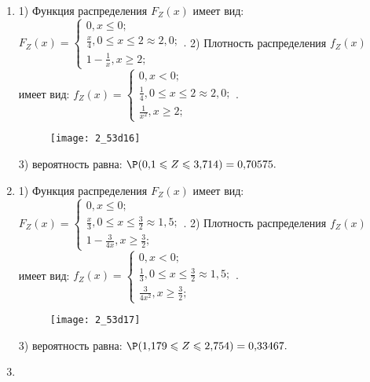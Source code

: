 \documentclass[a4paper,12pt]{article}
\begin{document}
\begin{enumerate}
\item


1) Функция распределения $F_Z(x)$ имеет вид:
$
F_Z(x)=\left\{
\begin{array}{l}
0, x\leqslant 0;\\
\frac{x}{4}, 0\leqslant x\leqslant 2\approx 2,\!0;\\
1 - \frac{1}{x}, x\geqslant2;
\end{array}.
\right.
$
2) Плотность распределения $f_Z(x)$ имеет вид:
$
f_Z(x)=\left\{
\begin{array}{l}
0, x<0;\\
\frac{1}{4}, 0\leqslant x\leqslant 2\approx 2,\!0;\\
\frac{1}{x^{2}}, x\geqslant2;
\end{array}.
\right.
$


\begin{figure}[H]
    \texttt{[image: 2\_53d16]}
\end{figure}


3) вероятность равна:
$
\P(0,\!1\leqslant Z\leqslant 3,\!714)=
0,\!70575.
$



\item


1) Функция распределения $F_Z(x)$ имеет вид:
$
F_Z(x)=\left\{
\begin{array}{l}
0, x\leqslant 0;\\
\frac{x}{3}, 0\leqslant x\leqslant \frac{3}{2}\approx 1,\!5;\\
1 - \frac{3}{4 x}, x\geqslant\frac{3}{2};
\end{array}.
\right.
$
2) Плотность распределения $f_Z(x)$ имеет вид:
$
f_Z(x)=\left\{
\begin{array}{l}
0, x<0;\\
\frac{1}{3}, 0\leqslant x\leqslant \frac{3}{2}\approx 1,\!5;\\
\frac{3}{4 x^{2}}, x\geqslant\frac{3}{2};
\end{array}.
\right.
$


\begin{figure}[H]
    \texttt{[image: 2\_53d17]}
\end{figure}


3) вероятность равна:
$
\P(1,\!179\leqslant Z\leqslant 2,\!754)=
0,\!33467.
$



\item



\end{enumerate}
\end{document}
